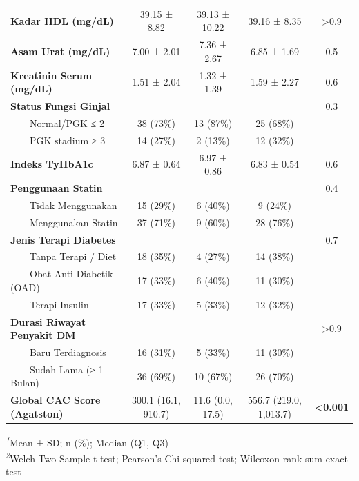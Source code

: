 \documentclass[
  indonesian,
]{agujournal2019}
\begin{document}
\begin{table}
{\begin{tabular*}{\linewidth}{@{\extracolsep{\fill}}lcccc}
{\bfseries Kadar HDL (mg/dL)} & 39.15 ± 8.82 & 39.13 ± 10.22 & 39.16 ± 8.35 & >0.9 \\ 
{\bfseries Asam Urat (mg/dL)} & 7.00 ± 2.01 & 7.36 ± 2.67 & 6.85 ± 1.69 & 0.5 \\ 
{\bfseries Kreatinin Serum (mg/dL)} & 1.51 ± 2.04 & 1.32 ± 1.39 & 1.59 ± 2.27 & 0.6 \\ 
{\bfseries Status Fungsi Ginjal} &  &  &  & 0.3 \\ 
    Normal/PGK ≤ 2 & 38 (73\%) & 13 (87\%) & 25 (68\%) &  \\ 
    PGK stadium ≥ 3 & 14 (27\%) & 2 (13\%) & 12 (32\%) &  \\ 
{\bfseries Indeks TyHbA1c} & 6.87 ± 0.64 & 6.97 ± 0.86 & 6.83 ± 0.54 & 0.6 \\ 
{\bfseries Penggunaan Statin} &  &  &  & 0.4 \\ 
    Tidak Menggunakan & 15 (29\%) & 6 (40\%) & 9 (24\%) &  \\ 
    Menggunakan Statin & 37 (71\%) & 9 (60\%) & 28 (76\%) &  \\ 
{\bfseries Jenis Terapi Diabetes} &  &  &  & 0.7 \\ 
    Tanpa Terapi / Diet & 18 (35\%) & 4 (27\%) & 14 (38\%) &  \\ 
    Obat Anti-Diabetik (OAD) & 17 (33\%) & 6 (40\%) & 11 (30\%) &  \\ 
    Terapi Insulin & 17 (33\%) & 5 (33\%) & 12 (32\%) &  \\ 
{\bfseries Durasi Riwayat Penyakit DM} &  &  &  & >0.9 \\ 
    Baru Terdiagnosis & 16 (31\%) & 5 (33\%) & 11 (30\%) &  \\ 
    Sudah Lama (≥ 1 Bulan) & 36 (69\%) & 10 (67\%) & 26 (70\%) &  \\ 
{\bfseries Global CAC Score (Agatston)} & 300.1 (16.1, 910.7) & 11.6 (0.0, 17.5) & 556.7 (219.0, 1,013.7) & {\bfseries <0.001} \\ 
\bottomrule
\end{tabular*}
\begin{minipage}{\linewidth}
\vspace{.05em}
\textsuperscript{\textit{1}}Mean ± SD; n (\%); Median (Q1, Q3)\\
\textsuperscript{\textit{2}}Welch Two Sample t-test; Pearson's Chi-squared test; Wilcoxon rank sum exact test\\
\end{minipage}

}

\end{table}%
\end{document}
